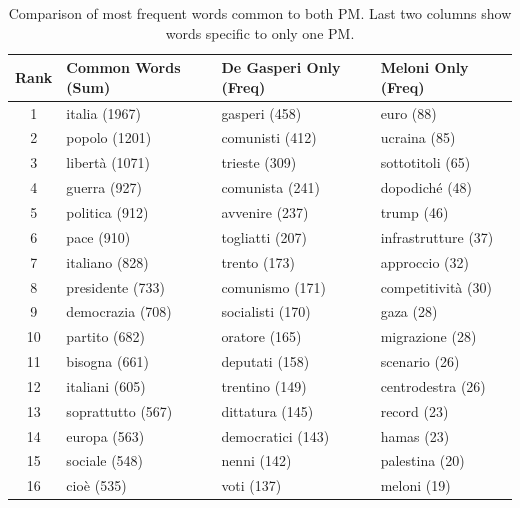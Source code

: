 \begin{table}[h]
    \centering
    \caption{Comparison of most frequent words common to both PM. Last two columns show words specific to only one PM.}
    \label{tab:word_comparison_aligned}
    \begin{tabular}{clll}
        \toprule
        \textbf{Rank} & \textbf{Common Words \hfill (Sum)} & \textbf{De Gasperi Only \hfill (Freq)} & \textbf{Meloni Only \hfill (Freq)} \\
        \midrule
        1  & italia \hfill (1967)     & gasperi \hfill (458)    & euro \hfill (88)           \\
        2  & popolo \hfill (1201)     & comunisti \hfill (412)  & ucraina \hfill (85)        \\
        3  & libertà \hfill (1071)    & trieste \hfill (309)    & sottotitoli \hfill (65)    \\
        4  & guerra \hfill (927)      & comunista \hfill (241)  & dopodiché \hfill (48)      \\
        5  & politica \hfill (912)    & avvenire \hfill (237)   & trump \hfill (46)          \\
        6  & pace \hfill (910)        & togliatti \hfill (207)  & infrastrutture \hfill (37) \\
        7  & italiano \hfill (828)    & trento \hfill (173)     & approccio \hfill (32)      \\
        8  & presidente \hfill (733)  & comunismo \hfill (171)  & competitività \hfill (30)  \\
        9  & democrazia \hfill (708)  & socialisti \hfill (170) & gaza \hfill (28)           \\
        10 & partito \hfill (682)     & oratore \hfill (165)    & migrazione \hfill (28)     \\
        11 & bisogna \hfill (661)     & deputati \hfill (158)   & scenario \hfill (26)       \\
        12 & italiani \hfill (605)    & trentino \hfill (149)   & centrodestra \hfill (26)   \\
        13 & soprattutto \hfill (567) & dittatura \hfill (145)  & record \hfill (23)         \\
        14 & europa \hfill (563)      & democratici \hfill (143) & hamas \hfill (23)          \\
        15 & sociale \hfill (548)     & nenni \hfill (142)      & palestina \hfill (20)      \\
        16 & cioè \hfill (535)        & voti \hfill (137)       & meloni \hfill (19)         \\

\end{tabular}
\end{table}
